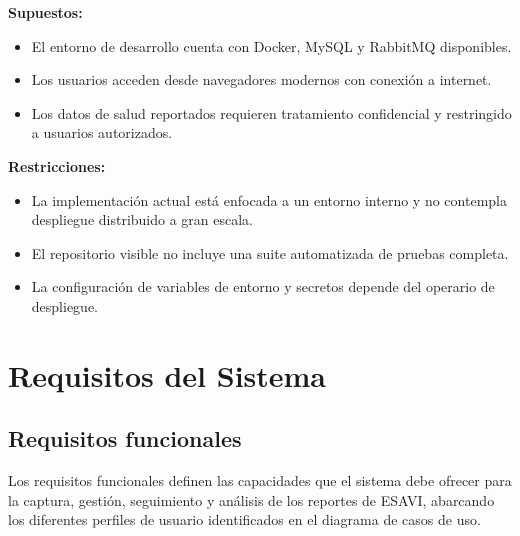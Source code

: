\documentclass[12pt,letterpaper]{article}
\begin{document}
\textbf{Supuestos:}
\begin{itemize}
\item El entorno de desarrollo cuenta con Docker, MySQL y RabbitMQ disponibles.
\item Los usuarios acceden desde navegadores modernos con conexión a internet.
\item Los datos de salud reportados requieren tratamiento confidencial y restringido a usuarios autorizados.
\end{itemize}

\textbf{Restricciones:}
\begin{itemize}
\item La implementación actual está enfocada a un entorno interno y no contempla despliegue distribuido a gran escala.
\item El repositorio visible no incluye una suite automatizada de pruebas completa.
\item La configuración de variables de entorno y secretos depende del operario de despliegue.
\end{itemize}
	











	\section{Requisitos del Sistema}

\subsection{Requisitos funcionales}

Los requisitos funcionales definen las capacidades que el sistema debe ofrecer para la captura, gestión, seguimiento y análisis de los reportes de ESAVI, abarcando los diferentes perfiles de usuario identificados en el diagrama de casos de uso.
\end{document}
